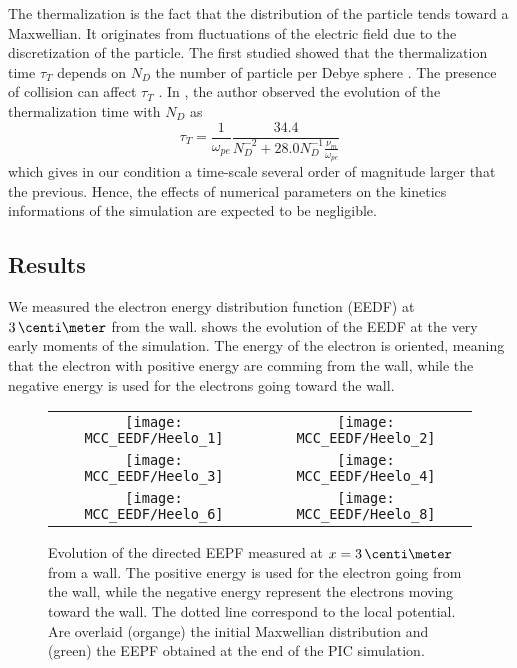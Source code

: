 The thermalization is the fact that the distribution of the particle tends toward a Maxwellian.
It originates from fluctuations of the electric field due to the discretization of the particle.
The first studied showed that the thermalization time $\tau_T$ depends on $N_D$ the number of particle per Debye sphere \citep{dawson1964,montgomery1970}.
The presence of collision can affect $\tau_T$  \citep{turner2006,lai2014}.
In \citet{turner2006}, the author observed the evolution of the thermalization time with $N_D$ as
\begin{equation} \label{eq-taut}
  \tau_T = \frac{1}{\omega_{pe}} \frac{34.4}{N_D^{-2} + 28.0 N_D^{-1} \frac{\nu_m}{\omega_{pe}}}
\end{equation}
which gives in our condition a time-scale several order of magnitude larger that the previous.
Hence, the effects of numerical parameters on the kinetics informations of the simulation are expected to be negligible.


\subsection{Results} \label{subsec-MCMresults}

We measured the electron energy distribution function (EEDF) at $3\,\centi\meter$ from the wall.
 shows the evolution of the EEDF at the very early moments of the simulation.
The energy of the electron is oriented, meaning that the electron with positive energy are comming from the wall, while the negative energy is used for the electrons going toward the wall.

\begin{figure}
  \begin{tabular}{cc}
    \texttt{[image: MCC\_EEDF/Heelo\_1]} &
    \texttt{[image: MCC\_EEDF/Heelo\_2]} \\
    \texttt{[image: MCC\_EEDF/Heelo\_3]} &
    \texttt{[image: MCC\_EEDF/Heelo\_4]} \\
    \texttt{[image: MCC\_EEDF/Heelo\_6]} &
    \texttt{[image: MCC\_EEDF/Heelo\_8]} \\
  \end{tabular}
  \caption{Evolution of the directed EEPF measured at $x=3\,\centi\meter$ from a wall. The positive energy is used for the electron going from the wall, while the negative energy represent the electrons moving toward the wall. The dotted line correspond to the local potential. Are overlaid (organge) the initial Maxwellian distribution and (green) the EEPF obtained at the end of the \ac{PIC} simulation. }
  \label{fig-zoom_init_Mc}
\end{figure}

